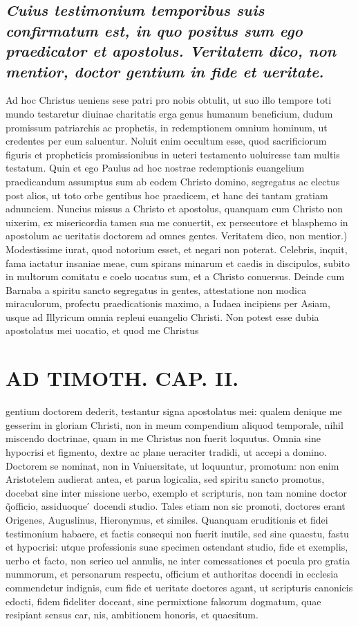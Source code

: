 \documentclass{article}
\begin{document}
\begin{pages}
\subsection*{\textit{Cuius testimonium temporibus suis confirmatum est, in quo positus sum ego praedicator et apostolus. Veritatem dico, non mentior, doctor gentium in fide et ueritate. }}\pstart Ad hoc Christus ueniens sese patri pro nobis obtulit, ut suo illo tempore toti mundo testaretur diuinae charitatis erga genus humanum beneficium, dudum promissum patriarchis ac prophetis, in redemptionem omnium hominum, ut credentes per eum saluentur. Noluit enim occultum esse, quod sacrificiorum figuris et propheticis promissionibus in ueteri testamento uoluiresse tam multis testatum. Quin et ego Paulus ad hoc nostrae redemptionis euangelium praedicandum assumptus sum ab eodem Christo domino, segregatus ac electus post alios, ut toto orbe gentibus hoc praedicem, et hanc dei tantam gratiam adnunciem. Nuncius missus a Christo et apostolus, quanquam cum Christo non uixerim, ex misericordia tamen sua me conuertit, ex persecutore et blasphemo in apostolum ac ueritatis doctorem ad omnes gentes. Veritatem dico, non mentior.) Modestissime iurat, quod notorium esset, et negari non poterat. Celebris, inquit, fama iactatur insaniae meae, cum spirans minarum et caedis in discipulos, subito in multorum comitatu e coelo uocatus sum, et a Christo conuersus. Deinde cum Barnaba a spiritu sancto segregatus in gentes, attestatione non modica miraculorum, profectu praedicationis maximo, a Iudaea incipiens per Asiam, usque ad Illyricum omnia repleui euangelio Christi. Non potest esse dubia apostolatus mei uocatio, et quod me Christus  \pend
\section*{AD TIMOTH. CAP. II. }
\marginpar{[ p.485 ]}\pstart gentium doctorem dederit, testantur signa apostolatus mei: qualem denique me gesserim in gloriam Christi, non in meum compendium aliquod temporale, nihil miscendo doctrinae, quam in me Christus non fuerit loquutus. Omnia sine hypocrisi et figmento, dextre ac plane ueraciter tradidi, ut accepi a domino. Doctorem se nominat, non in Vniuersitate, ut loquuntur, promotum: non enim Aristotelem audierat antea, et parua logicalia, sed spiritu sancto promotus, docebat sine inter missione uerbo, exemplo et scripturis, non tam nomine doctor q̃officio, assiduoque ́ docendi studio. Tales etiam non sic promoti, doctores erant Origenes, Auguslinus, Hieronymus, et similes. Quanquam eruditionis et fidei testimonium habaere, et factis consequi non fuerit inutile, sed sine quaestu, fastu et hypocrisi: utque professionis suae specimen ostendant studio, fide et exemplis, uerbo et facto, non serico uel annulis, ne inter comessationes et pocula pro gratia nummorum, et personarum respectu, officium et authoritas docendi in ecclesia commendetur indignis, cum fide et ueritate doctores agant, ut scripturis canonicis edocti, fidem fideliter doceant, sine permixtione falsorum dogmatum, quae resipiant sensus car, nis, ambitionem honoris, et quaesitum.  \pend
{}
{}

\end{pages}
\end{document}
